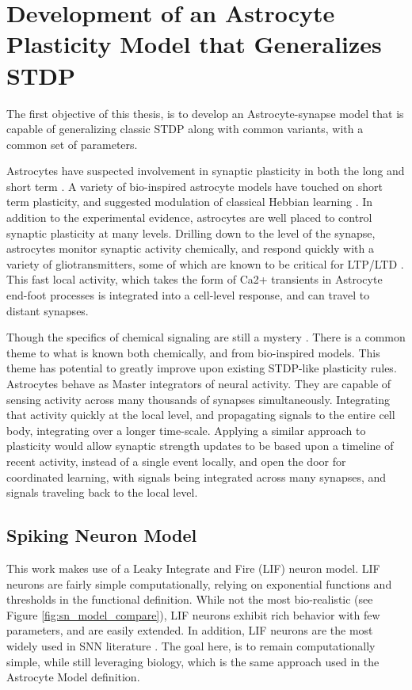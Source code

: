 %

\chapter{Development of an Astrocyte Plasticity Model that Generalizes STDP} \label{chapter:astro_plasticity_modeal}
    The first objective of this thesis, is to develop an Astrocyte-synapse model
    that is capable of generalizing classic STDP along with common
    variants, with a common set of parameters.

    Astrocytes have suspected involvement in synaptic plasticity in both the
    long \cite{min_2012} and short term \cite{pitta_2012}. A variety of
    bio-inspired astrocyte models have touched on short term plasticity, and
    suggested modulation of classical Hebbian learning \cite{pitta_2016}. In
    addition to the experimental evidence, astrocytes are well placed to control
    synaptic plasticity at many levels. Drilling down to the level of the
    synapse, astrocytes monitor synaptic activity chemically, and respond
    quickly with a variety of gliotransmitters, some of which are known to be
    critical for LTP/LTD \cite{min_2012}. This fast local activity, which takes
    the form of Ca2+ transients in Astrocyte end-foot processes is integrated
    into a cell-level response, and can travel to distant synapses.

    Though the specifics of chemical signaling are still a mystery
    \cite{manninen_2018}. There is a common theme to what is known both
    chemically, and from bio-inspired models. This theme has potential to
    greatly improve upon existing STDP-like plasticity rules. Astrocytes behave
    as Master integrators of neural activity. They are capable of sensing
    activity across many thousands of synapses simultaneously. Integrating that
    activity quickly at the local level, and propagating signals to the entire
    cell body, integrating over a longer time-scale. Applying a similar approach
    to plasticity would allow synaptic strength updates to be based upon a
    timeline of recent activity, instead of a single event locally, and open the
    door for coordinated learning, with signals being integrated across many
    synapses, and signals traveling back to the local level.

    \section{Spiking Neuron Model}
    This work makes use of a Leaky Integrate and Fire (LIF) neuron model. LIF
    neurons are fairly simple computationally, relying on exponential functions
    and thresholds in the functional definition. While not the most
    bio-realistic (see Figure \ref{fig:sn_model_compare}), LIF neurons exhibit
    rich behavior with few parameters, and are easily extended. In addition, LIF
    neurons are the most widely used in SNN literature \cite{ponulak_2011}. The
    goal here, is to remain computationally simple, while still leveraging
    biology, which is the same approach used in the Astrocyte Model definition.

